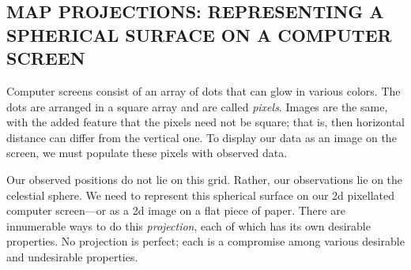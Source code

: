 \documentclass[psfig,preprint]{aastex}
\begin{document}
\subsection{MAP PROJECTIONS: REPRESENTING A SPHERICAL SURFACE ON A COMPUTER SCREEN}

Computer screens consist of an array of dots that can glow in various
colors. The dots are arranged in a square array and are called {\it
  pixels}. Images are the same, with the added feature that
the pixels need not be square; that is, then horizontal distance can
differ from the vertical one. To display our data as an image on the
screen, we must populate these pixels with observed data. 

Our observed positions do not lie on this grid. Rather, our observations
lie on the celestial sphere. We need to represent this spherical surface
on our 2d pixellated computer screen---or as a 2d image on
a flat piece of paper. There are innumerable ways to do this
{\it projection}, each of which has its own
desirable properties. No projection is perfect; each is a compromise 
among various desirable and undesirable properties. 
\end{document}
